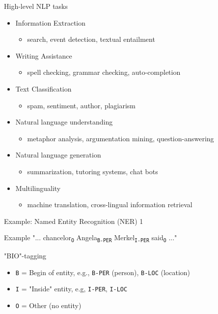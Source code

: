 \documentclass[12pt]{beamer}
\newcommand*\POS[1]{\textsubscript{\texttt{#1}}} %
\begin{document}
\begin{frame}{High-level NLP tasks}


\begin{itemize}
	\item Information Extraction
	\begin{itemize}
		\item search, event detection, textual entailment
	\end{itemize}
	\item Writing Assistance 
	\begin{itemize}
		\item spell checking, grammar checking, auto-completion
	\end{itemize}
	\item Text Classification
	\begin{itemize}
		\item spam, sentiment, author, plagiarism
	\end{itemize}
	\item Natural language understanding 
	\begin{itemize}
		\item metaphor analysis, argumentation mining, question-answering
	\end{itemize}
	\item Natural language generation
	\begin{itemize}
		\item summarization, tutoring systems, chat bots
	\end{itemize}
	\item Multilinguality
	\begin{itemize}
		\item machine translation, cross-lingual information retrieval
	\end{itemize}
\end{itemize}

	
\end{frame}


\begin{frame}{Example: Named Entity Recognition (NER) 1}

\begin{exampleblock}{Example}
"... chancelor\POS{O} Angela\POS{B-PER} Merkel\POS{I-PER} said\POS{O} ..."
\end{exampleblock}

"BIO"-tagging
\begin{itemize}
	\item \texttt{B} = Begin of entity, e.g., \texttt{B-PER} (person), \texttt{B-LOC} (location)
	\item \texttt{I} = "Inside" entity, e.g, \texttt{I-PER}, \texttt{I-LOC}
	\item \texttt{O} = Other (no entity)
\end{itemize}
	
\end{frame}
\end{document}
